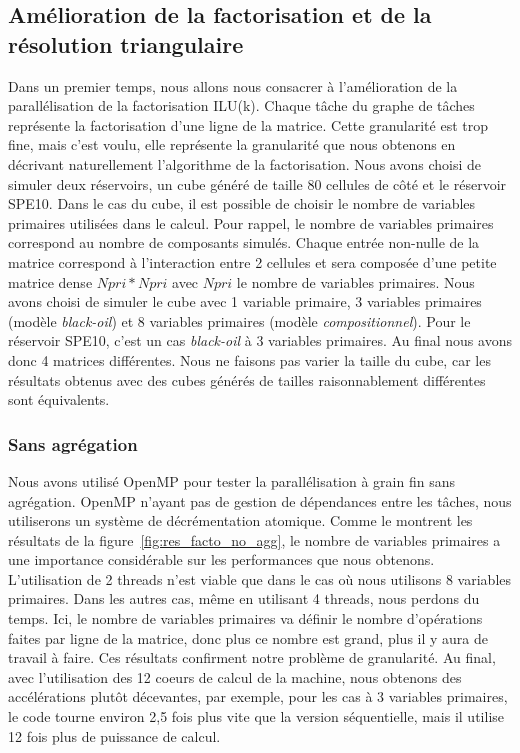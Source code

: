 \subsection{Amélioration de la factorisation et de la résolution triangulaire}
Dans un premier temps, nous allons nous consacrer à l'amélioration de la parallélisation de la factorisation ILU(k).
%
Chaque tâche du graphe de tâches représente la factorisation d'une ligne de la matrice.
%
Cette granularité est trop fine, mais c'est voulu, elle représente la granularité que nous obtenons en décrivant naturellement l'algorithme de la factorisation.
%
Nous avons choisi de simuler deux réservoirs, un cube généré de taille 80 cellules de côté et le réservoir SPE10.
%
Dans le cas du cube, il est possible de choisir le nombre de variables primaires utilisées dans le calcul.
%
Pour rappel, le nombre de variables primaires correspond au nombre de composants simulés.
%
Chaque entrée non-nulle de la matrice correspond à l'interaction entre 2 cellules et sera composée d'une petite matrice dense $Npri*Npri$ avec $Npri$ le nombre de variables primaires.
%
Nous avons choisi de simuler le cube avec 1 variable primaire, 3 variables primaires (modèle {\em black-oil}) et 8 variables primaires (modèle {\em compositionnel}).
%
Pour le réservoir SPE10, c'est un cas {\em black-oil} à 3 variables primaires.
%
Au final nous avons donc 4 matrices différentes.
%
Nous ne faisons pas varier la taille du cube, car les résultats obtenus avec des cubes générés de tailles raisonnablement différentes sont équivalents.

\subsubsection{Sans agrégation}
Nous avons utilisé OpenMP pour tester la parallélisation à grain fin sans agrégation.
%
OpenMP n'ayant pas de gestion de dépendances entre les tâches, nous utiliserons un système de décrémentation atomique.
%
Comme le montrent les résultats de la figure~\ref{fig:res_facto_no_agg}, le nombre de variables primaires a une importance considérable sur les performances que nous obtenons.
%
L'utilisation de 2 threads n'est viable que dans le cas où nous utilisons 8 variables primaires.
%
Dans les autres cas, même en utilisant 4 threads, nous perdons du temps.
%
Ici, le nombre de variables primaires va définir le nombre d'opérations faites par ligne de la matrice, donc plus ce nombre est grand, plus il y aura de travail à faire.
%
Ces résultats confirment notre problème de granularité.
%
Au final, avec l'utilisation des 12 coeurs de calcul de la machine, nous obtenons des accélérations plutôt décevantes, par exemple, pour les cas à 3 variables primaires, le code tourne environ 2,5 fois plus vite que la version séquentielle, mais il utilise 12 fois plus de puissance de calcul.

